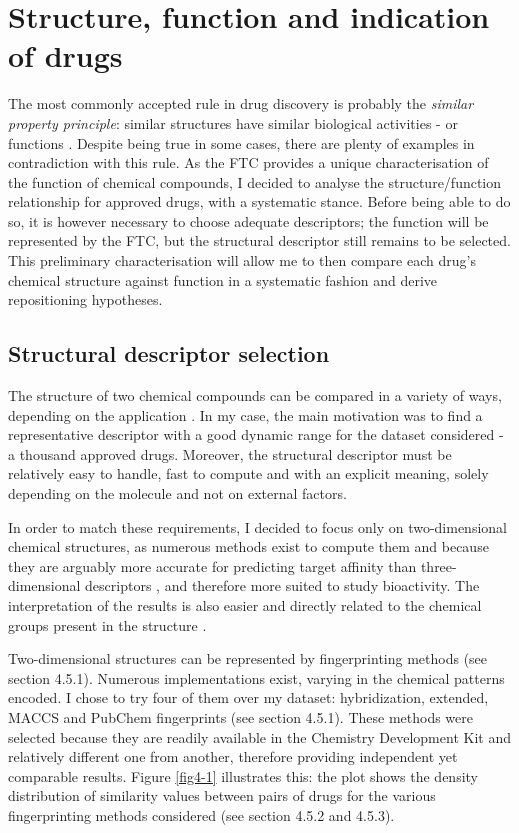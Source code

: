 \section{Structure, function and indication of drugs}
The most commonly accepted rule in drug discovery is probably the \emph{similar property principle}: similar structures have similar biological activities - or functions \citep{martin2002structurally} \citep{kubinyi1998similarity} \citep{johnson1990concepts}. Despite being true in some cases, there are plenty of examples in contradiction with this rule. As the FTC provides a unique characterisation of the function of chemical compounds, I decided to analyse the structure/function relationship for approved drugs, with a systematic stance. Before being able to do so, it is however necessary to choose adequate descriptors; the function will be represented by the FTC, but the structural descriptor still remains to be selected. This preliminary characterisation will allow me to then compare each drug's chemical structure against function in a systematic fashion and derive repositioning hypotheses.

\subsection{Structural descriptor selection}
The structure of two chemical compounds can be compared in a variety of ways, depending on the application \citep{johnson1990concepts}. In my case, the main motivation was to find a representative descriptor with a good dynamic range for the dataset considered - a thousand approved drugs. Moreover, the structural descriptor must be relatively easy to handle, fast to compute and with an explicit meaning, solely depending on the molecule and not on external factors.

In order to match these requirements, I decided to focus only on two-dimensional chemical structures, as numerous methods exist to compute them and because they are arguably more accurate for predicting target affinity than three-dimensional descriptors \citep{nettles2006bridging}, and therefore more suited to study bioactivity. The interpretation of the results is also easier and directly related to the chemical groups present in the structure \citep{todeschini2009molecular}.

Two-dimensional structures can be represented by fingerprinting methods (see section 4.5.1). Numerous implementations exist, varying in the chemical patterns encoded. I chose to try four of them over my dataset: hybridization, extended, MACCS and PubChem fingerprints (see section 4.5.1). These methods were selected because they are readily available in the Chemistry Development Kit \citep{steinbeck2003chemistry} and relatively different one from another, therefore providing independent yet comparable results. Figure \ref{fig4-1} illustrates this: the plot shows the density distribution of similarity values between pairs of drugs for the various fingerprinting methods considered (see section 4.5.2 and 4.5.3).

